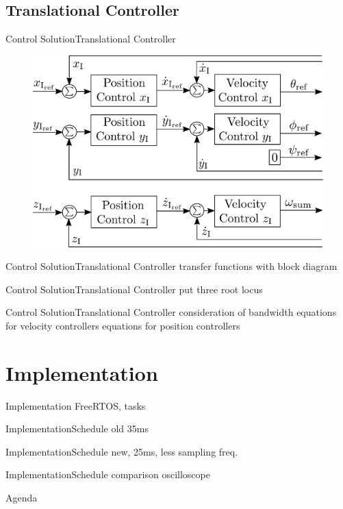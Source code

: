 \subsection{Translational Controller}
\begin{frame}{Control Solution}{Translational Controller}
    \begin{figure}[H]
        \includegraphics[width=1\textwidth]{figures/TranslationalControlDiagramSmall}
    \end{figure}      
\end{frame}

\begin{frame}{Control Solution}{Translational Controller}
    transfer functions with block diagram
\end{frame}

\begin{frame}{Control Solution}{Translational Controller}
    put three root locus      
\end{frame}

\begin{frame}{Control Solution}{Translational Controller}
    consideration of bandwidth
    equations for velocity controllers
    equations for position controllers
\end{frame}


\section{Implementation}
\begin{frame}{Implementation}{}
    FreeRTOS, tasks
\end{frame}

\begin{frame}{Implementation}{Schedule}
    old 35ms 
\end{frame}

\begin{frame}{Implementation}{Schedule}
   new, 25ms, less sampling freq. 
\end{frame}

\begin{frame}{Implementation}{Schedule}
   comparison oscilloscope
\end{frame}
    
    
\begin{frame}{Agenda}{}
    \tableofcontents
\end{frame}

